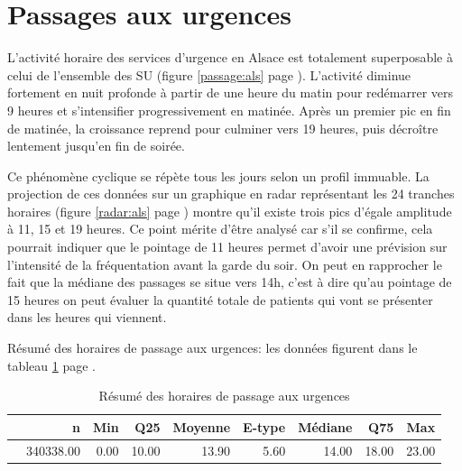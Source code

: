 \documentclass[12pt,english,french,twoside]{book}\usepackage[]{graphicx}\usepackage[]{color}
\begin{document}
\section{Passages aux urgences}


L'activité horaire des services d'urgence en Alsace est totalement superposable à celui de l'ensemble des SU (figure \ref{passage:als} page \pageref{passage:als}). L'activité diminue fortement en nuit profonde à partir de une heure du matin pour redémarrer vers 9 heures et s'intensifier progressivement en matinée. Après un premier pic en fin de matinée, la croissance reprend pour culminer vers 19 heures, puis décroître lentement jusqu'en fin de soirée.

Ce phénomène cyclique se répète tous les jours selon un profil immuable. La projection de ces données sur un graphique en radar représentant les 24 tranches horaires (figure \ref{radar:als} page \pageref{radar:als}) montre qu'il existe trois pics d'égale amplitude à 11, 15 et 19 heures. Ce point mérite d'être analysé car s'il se confirme, cela pourrait indiquer que le pointage de 11 heures permet d'avoir une prévision sur l'intensité de la fréquentation avant la garde du soir. On peut en rapprocher le fait que la médiane des passages se situe vers 14h, c'est à dire qu'au pointage de 15 heures on peut évaluer la quantité totale de patients qui vont se présenter dans les heures qui viennent.

Résumé des horaires de passage aux urgences: les données figurent dans le tableau \ref{tab:24} page \pageref{tab:24}.
\begin{table}[ht]
\centering
\begin{tabular}{rrrrrrrrr}
  \hline
 & n & Min & Q25 & Moyenne & E-type & Médiane & Q75 & Max \\ 
  \hline
 & 340338.00 & 0.00 & 10.00 & 13.90 & 5.60 & 14.00 & 18.00 & 23.00 \\ 
   \hline
\end{tabular}
\caption[horaires de passage]{Résumé des horaires de passage aux urgences} 
\label{tab:24}
\end{table}



% 
\end{document}

